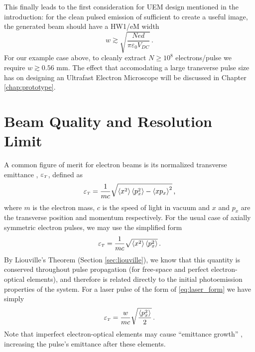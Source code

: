 This finally leads to the first consideration for UEM design mentioned in the introduction: for the clean pulsed emission of sufficient to create a useful image, the generated beam should have a HW1/eM width 
\begin{equation} \label{eq:minimum_w}
  w \gtrsim \sqrt{\frac{N e d}{\pi \varepsilon_0 V_{DC}}} \,\text{.}
\end{equation}
For our example case above, to cleanly extract $N \ge 10^8$ electrons/pulse we require $w \gtrsim 0.56 \text{ mm}$.
The effect that accomodating a large transverse pulse size has on designing an Ultrafast Electron Microscope will be discussed in Chapter \ref{chap:prototype}. 

\section{Beam Quality and Resolution Limit} \label{sec:must_reduce_transverse_momentum}

A common figure of merit for electron beams is its normalized transverse emittance \cite{jensen_emittance_2010}, $\varepsilon_{{\scriptscriptstyle T}}$, defined as 
\begin{equation}
  \varepsilon_{{\scriptscriptstyle T}} = \frac{1}{m c} \sqrt{ \left < x^2 \right > \left < p_x^2 \right > - \left < x p_x \right >^2 } \,\text{,}
\end{equation}
where $m$ is the electron mass, $c$ is the speed of light in vacuum and $x$ and $p_x$ are the transverse position and momentum respectively.
For the usual case of axially symmetric electron pulses, we may use the simplified form
\begin{equation} \label{eq:emittance_definition}
  \varepsilon_{{\scriptscriptstyle T}} = \frac{1}{m c} \sqrt{ \left < x^2 \right > \left < p_x^2 \right > } \,\text{.}
\end{equation}
By Liouville's Theorem (Section \ref{sec:liouville}), we know that this quantity is conserved throughout pulse propagation (for free-space and perfect electron-optical elements), and therefore is related directly to the initial photoemission properties of the system.
For a laser pulse of the form of \ref{eq:laser_form} we have simply
\begin{equation} \label{eq:emittance_definition_w}
  \varepsilon_{{\scriptscriptstyle T}} = \frac{w}{m c} \sqrt{ \frac{\left < p_x^2 \right >}{2} } \,\text{.}
\end{equation}
Note that imperfect electron-optical elements may cause ``emittance growth'' \cite{oshea_reversible_1998}, increasing the pulse's emittance after these elements.


